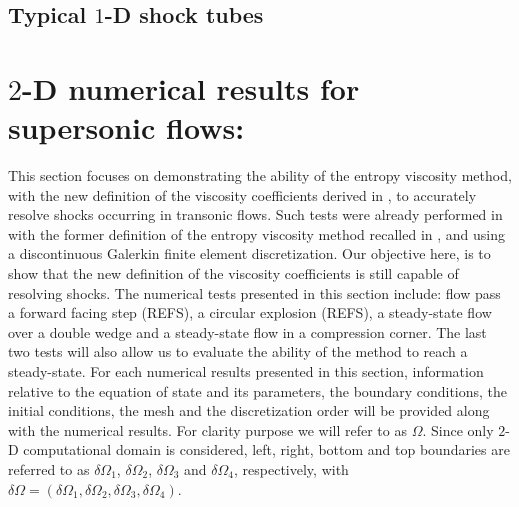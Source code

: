 \subsection{Typical $1$-D shock tubes \cite{Toro}} \label{sec:1d_toro}
\section{$2$-D numerical results for supersonic flows:} \label{sec:2d-supersonic-results}
This section focuses on demonstrating the ability of the entropy viscosity method, with the new definition of the viscosity coefficients derived in , to accurately resolve shocks occurring in transonic flows. Such tests were already performed in \cite{valentin} with the former definition of the entropy viscosity method recalled in , and using a discontinuous Galerkin finite element discretization. Our objective here, is to show that the new definition of the viscosity coefficients is still capable of resolving shocks. The numerical tests presented in this section include: flow pass a forward facing step (REFS), a circular explosion (REFS), a steady-state flow over a double wedge and a steady-state flow in a compression corner. The last two tests will also allow us to evaluate the ability of the method to reach a steady-state. For each numerical results presented in this section, information relative to the equation of state and its parameters, the boundary conditions, the initial conditions, the mesh and the discretization order will be provided along with the numerical results. For clarity purpose we will refer to as $\Omega$. Since only $2$-D computational domain is considered, left, right, bottom and top boundaries are referred to as $\delta \Omega_1$, $\delta \Omega_2$, $\delta \Omega_3$ and $\delta \Omega_4$, respectively, with $\delta \Omega = ( \delta \Omega_1,  \delta \Omega_2, \delta \Omega_3, \delta \Omega_4)$. 
